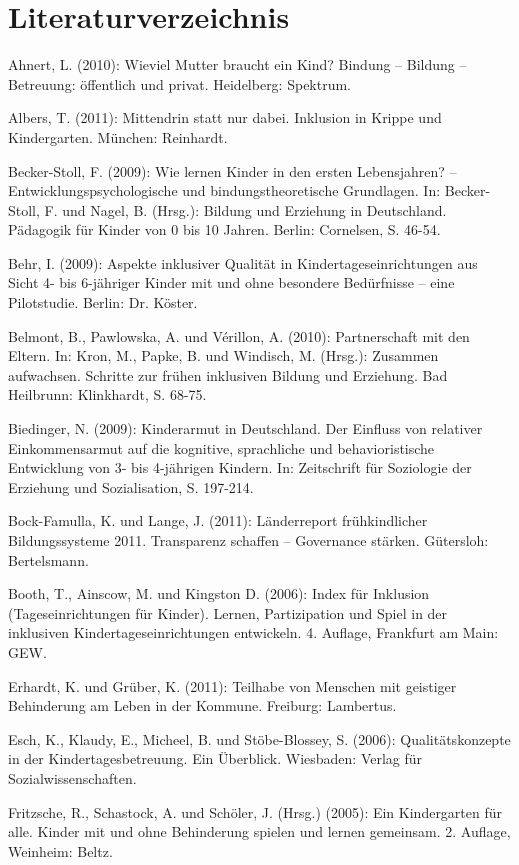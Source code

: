 \chapter*{Literaturverzeichnis}

Ahnert, L. (2010): Wieviel Mutter braucht ein Kind? Bindung – Bildung – Betreuung: öffentlich und privat. Heidelberg: Spektrum.

Albers, T. (2011): Mittendrin statt nur dabei. Inklusion in Krippe und Kindergarten. München: Reinhardt.

Becker-Stoll, F. (2009): Wie lernen Kinder in den ersten Lebensjahren? – Entwicklungspsychologische und bindungstheoretische Grundlagen. In: Becker-Stoll, F. und Nagel, B. (Hrsg.): Bildung und Erziehung in Deutschland. Pädagogik für Kinder von 0 bis 10 Jahren. Berlin: Cornelsen, S. 46-54.

Behr, I. (2009): Aspekte inklusiver Qualität in Kindertageseinrichtungen aus Sicht 4- bis 6-jähriger Kinder mit und ohne besondere Bedürfnisse – eine Pilotstudie. Berlin: Dr. Köster.

Belmont, B., Pawlowska, A. und Vérillon, A. (2010):
Partnerschaft mit den Eltern. In: Kron, M., Papke, B. und Windisch, M. (Hrsg.): Zusammen aufwachsen. Schritte zur frühen inklusiven Bildung und Erziehung. Bad Heilbrunn: Klinkhardt, S. 68-75.

Biedinger, N. (2009): Kinderarmut in Deutschland. Der Einfluss von relativer Einkommensarmut auf die kognitive, sprachliche und behavioristische Entwicklung von 3- bis 4-jährigen Kindern. In:  Zeitschrift für Soziologie der Erziehung und Sozialisation, S. 197-214. 

Bock-Famulla, K. und Lange, J. (2011): Länderreport frühkindlicher Bildungssysteme 2011. Transparenz schaffen – Governance stärken.
Gütersloh: Bertelsmann.

Booth, T., Ainscow, M. und Kingston D. (2006): Index für Inklusion (Tageseinrichtungen für Kinder). Lernen, Partizipation und Spiel in der inklusiven Kindertageseinrichtungen entwickeln. 4. Auflage, Frankfurt am Main: GEW. 

Erhardt, K. und Grüber, K. (2011): Teilhabe von Menschen mit geistiger Behinderung am Leben in der Kommune. Freiburg: Lambertus.

Esch, K., Klaudy, E., Micheel, B. und Stöbe-Blossey, S. (2006): Qualitätskonzepte in der Kindertagesbetreuung. Ein Überblick. Wiesbaden: Verlag für Sozialwissenschaften.

Fritzsche, R., Schastock, A. und Schöler, J. (Hrsg.) (2005): Ein Kindergarten für alle. Kinder mit und ohne Behinderung spielen und lernen gemeinsam. 2. Auflage, Weinheim: Beltz. 


